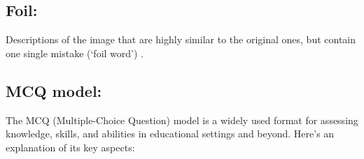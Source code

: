 \subsection{Foil:}
Descriptions of the image that are highly similar to the original ones, but contain one single mistake (‘foil word’) \cite{sheknar2017foil}.

\subsection{MCQ model:} \label{mcq_model}

The MCQ (Multiple-Choice Question) model is a widely used format for assessing knowledge, skills, and abilities in educational settings and beyond. Here’s an explanation of its key aspects:

